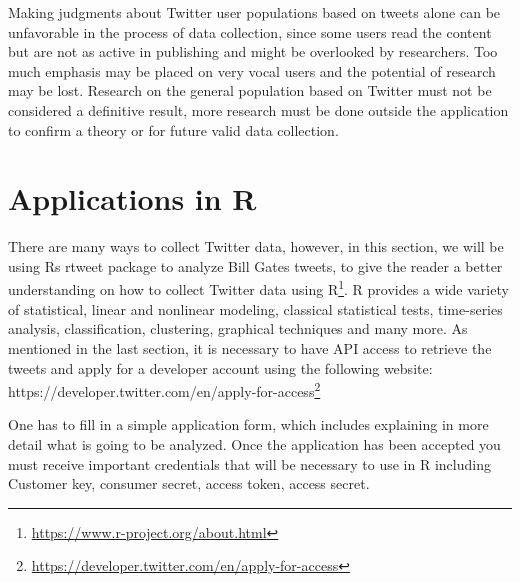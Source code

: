 Making judgments about Twitter user populations based on tweets alone can be unfavorable in the process of data collection, since some users read the content but are not as active in publishing and might be overlooked by researchers. Too much emphasis may be placed on very vocal users and the potential of research may be lost. Research on the general population based on Twitter must not be considered a definitive result, more research must be done outside the application to confirm a theory or for future valid data collection. 


\section{Applications in R}\label{sec:}
There are many ways to collect Twitter data, however, in this section, we will be using Rs rtweet package to analyze Bill Gates tweets, to give the reader a better understanding on how to collect Twitter data using R\footnote{\href{https://www.r-project.org/about.html}{https://www.r-project.org/about.html}}. R provides a wide variety of statistical, linear and nonlinear modeling, classical statistical tests, time-series analysis, classification, clustering, graphical techniques and many more. 
As mentioned in the last section, it is necessary to have API access to retrieve the tweets and apply for a developer account using the following website: 
https://developer.twitter.com/en/apply-for-access\footnote{\href{https://developer.twitter.com/en/apply-for-access}{https://developer.twitter.com/en/apply-for-access}}

One has to fill in a simple application form, which includes explaining in more detail what is going to be analyzed. Once the application has been accepted you must receive important credentials that will be necessary to use in R including Customer key, consumer secret, access token, access secret.

